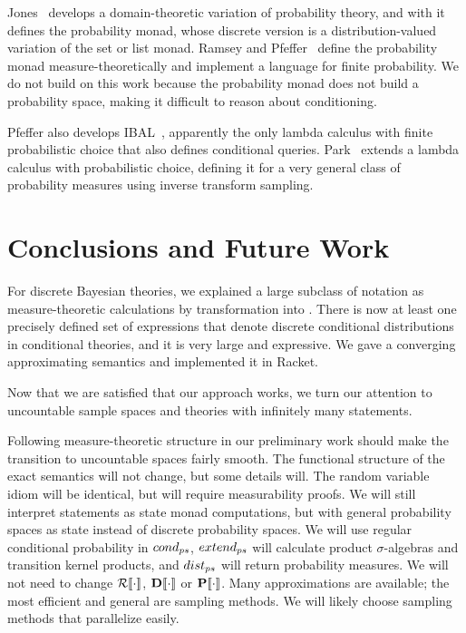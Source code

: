 Jones~\cite{cit:jones-1990thesis} develops a domain-theoretic variation of probability theory, and with it defines the probability monad, whose discrete version is a distribution-valued variation of the set or list monad. Ramsey and Pfeffer~\cite{cit:ramsey-2002popl-stochastic-short} define the probability monad measure-theoretically and implement a language for finite probability. We do not build on this work because the probability monad does not build a probability space, making it difficult to reason about conditioning.

Pfeffer also develops IBAL~\cite{cit:pfeffer-2007chapter-ibal}, apparently the only lambda calculus with finite probabilistic choice that also defines conditional queries. Park~\cite{cit:park-2008toplas-prob} extends a lambda calculus with probabilistic choice, defining it for a very general class of probability measures using inverse transform sampling.

\section{Conclusions and Future Work}
\label{sec:conclusion}

For discrete Bayesian theories, we explained a large subclass of notation as measure-theoretic calculations by transformation into \targetlang. There is now at least one precisely defined set of expressions that denote discrete conditional distributions in conditional theories, and it is very large and expressive. We gave a converging approximating semantics and implemented it in Racket.


Now that we are satisfied that our approach works, we turn our attention to uncountable sample spaces and theories with infinitely many statements.

Following measure-theoretic structure in our preliminary work should make the transition to uncountable spaces fairly smooth. The functional structure of the exact semantics will not change, but some details will. The random variable idiom will be identical, but will require measurability proofs. We will still interpret statements as state monad computations, but with general probability spaces as state instead of discrete probability spaces. We will use regular conditional probability in $cond_{ps}$, $extend_{ps}$ will calculate product $\sigma$-algebras and transition kernel products, and $dist_{ps}$ will return probability measures. We will not need to change $\mathcal{R}\!\left\llbracket{\cdot}\right\rrbracket$, $\mathbf{D}\!\left\llbracket{\cdot}\right\rrbracket$ or $\mathbf{P}\!\left\llbracket{\cdot}\right\rrbracket$. Many approximations are available; the most efficient and general are sampling methods. We will likely choose sampling methods that parallelize easily.

